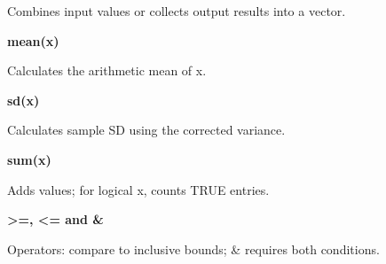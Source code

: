 \documentclass[11pt,a4paper]{article}
\begin{document}
Combines input values or collects output results into a vector.

\par\noindent\textbf{mean(x)}

Calculates the arithmetic mean of x.

\par\noindent\textbf{sd(x)}

Calculates sample SD using the corrected variance.

\par\noindent\textbf{sum(x)}

Adds values; for logical x, counts TRUE entries.

\par\noindent\textbf{>=, <= and \&}

Operators: compare to inclusive bounds; \& requires both conditions.

\medskip
\end{document}

